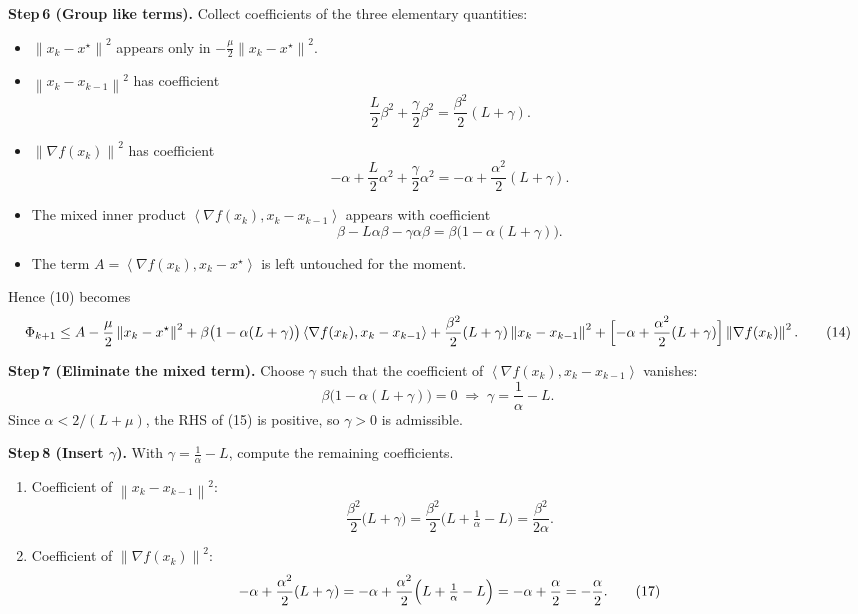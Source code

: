\documentclass{article}
\newcommand{\norm}[1]{\left\lVert#1\right\rVert}
\newcommand{\inner}[2]{\left\langle #1,#2\right\rangle}
\begin{document}
\bigskip
\noindent\textbf{Step 6 (Group like terms).}  
Collect coefficients of the three elementary quantities:
\begin{itemize}[leftmargin=*]
\item $\norm{x_k-x^\star}^{2}$ appears only in $-\frac{\mu}{2}\norm{x_k-x^\star}^{2}$.
\item $\norm{x_k-x_{k-1}}^{2}$ has coefficient 
\[
\frac{L}{2}\beta^{2}+\frac{\gamma}{2}\beta^{2}
= \frac{\beta^{2}}{2}(L+\gamma).
\tag{11}
\]
\item $\norm{\nabla f(x_k)}^{2}$ has coefficient 
\[
-\alpha+\frac{L}{2}\alpha^{2}+\frac{\gamma}{2}\alpha^{2}
= -\alpha+\frac{\alpha^{2}}{2}(L+\gamma).
\tag{12}
\]
\item The mixed inner product $\inner{\nabla f(x_k)}{x_k-x_{k-1}}$ appears with coefficient
\[
\beta-\!L\alpha\beta-\gamma\alpha\beta
= \beta\bigl(1-\alpha(L+\gamma)\bigr).
\tag{13}
\]
\item The term $A=\inner{\nabla f(x_k)}{x_k-x^\star}$ is left untouched for the moment.
\end{itemize}
Hence (10) becomes
\[
\Phi_{k+1}\le A-\frac{\mu}{2}\norm{x_k-x^\star}^{2}
   +\beta\bigl(1-\alpha(L+\gamma)\bigr)\inner{\nabla f(x_k)}{x_k-x_{k-1}}
   +\frac{\beta^{2}}{2}(L+\gamma)\norm{x_k-x_{k-1}}^{2}
   +\Bigl[-\alpha+\frac{\alpha^{2}}{2}(L+\gamma)\Bigr]\norm{\nabla f(x_k)}^{2}.
\tag{14}
\]

\bigskip
\noindent\textbf{Step 7 (Eliminate the mixed term).}  
Choose $\gamma$ such that the coefficient of $\inner{\nabla f(x_k)}{x_k-x_{k-1}}$ vanishes:
\[
\beta\bigl(1-\alpha(L+\gamma)\bigr)=0
\;\Longrightarrow\;
\gamma = \frac{1}{\alpha}-L.
\tag{15}
\]
Since $\alpha<2/(L+\mu)$, the RHS of (15) is positive, so $\gamma>0$ is admissible.

\bigskip
\noindent\textbf{Step 8 (Insert $\gamma$).}  
With $\gamma = \tfrac1\alpha-L$, compute the remaining coefficients.

\begin{enumerate}[label=(\roman*),leftmargin=*]
\item Coefficient of $\norm{x_k-x_{k-1}}^{2}$:
\[
\frac{\beta^{2}}{2}\bigl(L+\gamma\bigr)
= \frac{\beta^{2}}{2}\bigl(L+\tfrac1\alpha-L\bigr)
= \frac{\beta^{2}}{2\alpha}.
\tag{16}
\]
\item Coefficient of $\norm{\nabla f(x_k)}^{2}$:
\[
-\alpha+\frac{\alpha^{2}}{2}(L+\gamma)
=-\alpha+\frac{\alpha^{2}}{2}\Bigl(L+\tfrac1\alpha-L\Bigr)
=-\alpha+\frac{\alpha}{2}
=-\frac{\alpha}{2}.
\tag{17}
\]
\end{enumerate}
\end{document}
